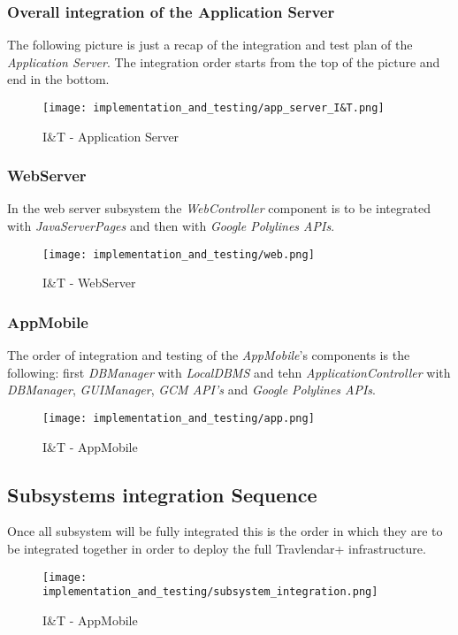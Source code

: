 \subsubsection{Overall integration of the Application Server}
The following picture is just a recap of the integration and test plan of the \textit{Application Server}. The integration order starts from the top of the picture and end in the bottom.
\begin{figure}[H]
	\begin{center}
		\texttt{[image: implementation\_and\_testing/app\_server\_I\&T.png]}
	\end{center}
	\caption{I\&T - Application Server}
\end{figure}

\subsubsection{WebServer}
In the web server subsystem the \textit{WebController} component is to be integrated with \textit{JavaServerPages} and then with \textit{Google Polylines APIs}. 
\begin{figure}[H]
	\begin{center}
		\texttt{[image: implementation\_and\_testing/web.png]}
	\end{center}
	\caption{I\&T - WebServer}
\end{figure}

\subsubsection{AppMobile}
The order of integration and testing of the \textit{AppMobile}'s components is the following: first \textit{DBManager} with \textit{LocalDBMS} and tehn \textit{ApplicationController} with \textit{DBManager}, \textit{GUIManager}, \textit{GCM API's} and \textit{Google Polylines APIs}. 
\begin{figure}[H]
	\begin{center}
		\texttt{[image: implementation\_and\_testing/app.png]}
	\end{center}
	\caption{I\&T - AppMobile}
\end{figure}
\newpage
\subsection{Subsystems integration Sequence}
Once all subsystem will be fully integrated this is the order in which they are to be integrated together in order to deploy the full Travlendar+ infrastructure.
\begin{figure}[H]
	\begin{center}
		\texttt{[image: implementation\_and\_testing/subsystem\_integration.png]}
	\end{center}
	\caption{I\&T - AppMobile}
\end{figure}